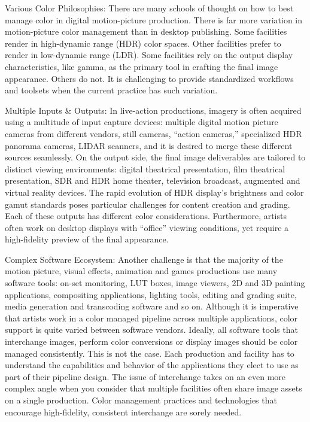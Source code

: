 Various Color Philosophies: There are many schools of thought on how to best manage color in digital motion-picture production. There is far more variation in motion-picture color management than in desktop publishing. Some facilities render in high-dynamic range (HDR) color spaces. Other facilities prefer to render in low-dynamic range (LDR). Some facilities rely on the output display characteristics, like gamma, as the primary tool in crafting the final image appearance. Others do not. It is challenging to provide standardized workflows and toolsets when the current practice has such variation.
												
Multiple Inputs & Outputs: In live-action productions, imagery is often acquired using a multitude of input capture devices: multiple digital motion picture cameras from different vendors, still cameras, “action cameras,” specialized HDR panorama cameras, LIDAR scanners, and it is desired to merge these different sources seamlessly. On the output side, the final image deliverables are tailored to distinct viewing environments: digital theatrical presentation, film theatrical presentation, SDR and HDR home theater, television broadcast, augmented and virtual reality devices. The rapid evolution of HDR display’s brightness and color gamut standards poses particular challenges for content creation and grading. Each of these outputs has different color considerations. Furthermore, artists often work on desktop displays with “office” viewing conditions, yet require a high-fidelity preview of the final appearance.
				
Complex Software Ecosystem: Another challenge is that the majority of the motion picture, visual effects, animation and games productions use many software tools: on-set monitoring, LUT boxes, image viewers, 2D and 3D painting applications, compositing applications, lighting tools, editing and grading suite, media generation and transcoding software  and so on. Although it is imperative that artists work in a color managed pipeline across multiple applications, color support is quite varied between software vendors. Ideally, all software tools that interchange images, perform color conversions or display images should be color managed consistently. This is not the case. Each production and facility has to understand the capabilities and behavior of the applications they elect to use as part of their pipeline design. The issue of interchange takes on an even more complex angle when you consider that multiple facilities often share image assets on a single production. Color management practices and technologies that encourage high-fidelity, consistent interchange are sorely needed.
						
